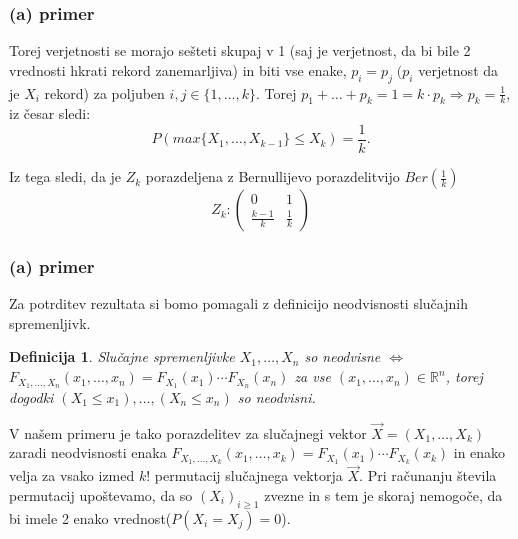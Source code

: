 \documentclass[12pt, hyperref={unicode}]{beamer}
\newtheorem{definicija}{Definicija}
\begin{document}
\begin{frame}

  \frametitle{(a) primer}
  Torej verjetnosti se morajo sešteti skupaj v 1 (saj je verjetnost, da bi bile 2 vrednosti hkrati rekord zanemarljiva)
  in biti vse enake, $p_i = p_j \; (p_i$ verjetnost da je $X_i$ rekord) za poljuben $i,j \in \{1,\dots , k \}$.
  Torej $p_1+ \dots + p_k = 1 = k \cdot p_k \Rightarrow p_k = \frac{1}{k}$, iz česar sledi:\\
  $$P(max\{X_1, \dots , X_{k-1}\} \leq X_k) = \frac{1}{k}.$$
  \vspace{5mm}

  Iz tega sledi, da je $Z_k$ porazdeljena z Bernullijevo porazdelitvijo $Ber(\frac{1}{k})$\\
  $$Z_k : \left( \begin{array}{cc} 0 & 1\\
  \frac{k-1}{k} & \frac{1}{k} \end{array}\right)$$

\end{frame}

\begin{frame}
   
  \frametitle{(a) primer}
  Za potrditev rezultata si bomo pomagali z definicijo neodvisnosti slučajnih spremenljivk.
  \begin{definicija}
    Slučajne spremenljivke $X_1, \dots , X_n$ so neodvisne $\Longleftrightarrow$
    $F_{X_1, \dots , X_n}(x_1, \dots , x_n)=F_{X_1}(x_1) \cdots F_{X_n}(x_n)$
    za vse $(x_1, \dots , x_n) \in \mathbb{R}^n$, torej dogodki $(X_1 \leq x_1), \dots , (X_n \leq x_n)$ so neodvisni.
  \end{definicija}   
  \vspace{1mm}
  V našem primeru je tako porazdelitev za slučajnegi vektor $\overrightarrow{X}=(X_1, \dots , X_{k})$ zaradi neodvisnosti enaka
  $F_{X_1, \dots , X_{k}}(x_1, \dots , x_k)=F_{X_1}(x_1) \cdots F_{X_{k}}(x_k)$
  in enako velja za vsako izmed $k!$ permutacij slučajnega vektorja $\overrightarrow{X}$.
  Pri računanju števila permutacij upoštevamo, da so $ (X_i)_{i\geq1} $ zvezne in s tem je skoraj nemogoče, da bi imele 2 enako vrednost($P(X_i=X_j)=0$).
  

\end{frame}
\end{document}
